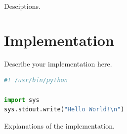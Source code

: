 \documentclass{article}
\begin{document}
Desciptions.

\section{Implementation}

Describe your implementation here.

\begin{lstlisting}[language=Python]
#! /usr/bin/python

import sys
sys.stdout.write("Hello World!\n")
\end{lstlisting}

Explanations of the implementation.


\end{document}
